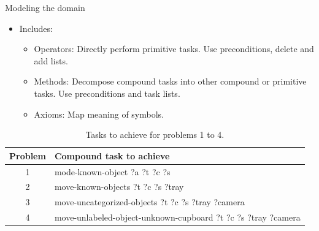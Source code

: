 \documentclass{beamer}
\begin{document}
	\begin{frame}{Modeling the domain}
		\begin{itemize}
			\item Includes:
			\begin{itemize}
				\item Operators: Directly perform primitive tasks. Use preconditions, delete and add lists.
				\item Methods: Decompose compound tasks into other compound or primitive tasks. Use preconditions and task lists.
				\item Axioms: Map meaning of symbols.
			\end{itemize}
		\end{itemize}
		
		\begin{table}[h!]
			
			\centering
			\scriptsize
			
			\begin{tabular}{cl}
				\toprule
				
				Problem & Compound task to achieve \\
				\midrule
				
				1 & mode-known-object ?a ?t ?c ?s \\
				
				\midrule
				
				2 & move-known-objects ?t ?c ?s ?tray \\
				
				\midrule
				
				3 & move-uncategorized-objects ?t ?c ?s ?tray ?camera \\
				
				\midrule
				
				4 & move-unlabeled-object-unknown-cupboard ?t ?c ?s ?tray ?camera \\
				
				\bottomrule
			\end{tabular}
			\caption{Tasks to achieve for problems 1 to 4.}
			\label{table:compund-tasks}
		\end{table}
		
	\end{frame}
	
\end{document}
